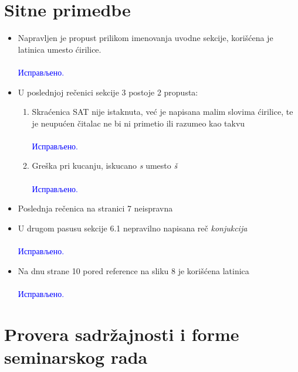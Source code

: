 \documentclass[a4paper]{report}
\newcommand{\odgovor}[1]{\textcolor{blue}{#1}}
\newcommand{\say}[1]{\textit{#1}}
\begin{document}
\section{Sitne primedbe}
\begin{itemize}
 \item Napravljen je propust prilikom imenovanja uvodne sekcije, korišćena je latinica umesto ćirilice.
     \\\\
    \odgovor{Исправљено.} 
	\\
 \item U poslednjoj rečenici sekcije 3 postoje 2 propusta:
 	\begin{enumerate}
 		\item Skraćenica SAT nije istaknuta, već je napisana malim slovima ćirilice, te je neupućen čitalac ne bi ni primetio ili razumeo kao takvu
     \\\\
    \odgovor{Исправљено.} 
	\\
 		\item Greška pri kucanju, iskucano \say{s} umesto \say{š}
     \\\\
    \odgovor{Исправљено.} 
	\\
 	\end{enumerate}
 \item Poslednja rečenica na stranici 7 neispravna
 \item U drugom pasusu sekcije 6.1 nepravilno napisana reč \say{konjukcija}
    \\\\
    \odgovor{Исправљено.} 
	\\
 \item Na dnu strane 10 pored reference na sliku 8 je korišćena latinica
      \\\\
    \odgovor{Исправљено.} 
	\\
\end{itemize}

\section{Provera sadržajnosti i forme seminarskog rada}
\end{document}
